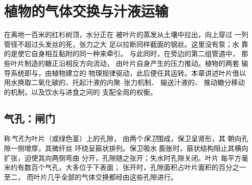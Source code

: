 \chapter{植物的气体交换与汁液运输}\label{ch:b1:plant-transport}

在离地一百米的红杉树顶，水分正在
被叶片的蒸发从土壤中拉出，向上穿过
一列管径不超过头发丝的死，张力之大
足以拉断同样截面的钢丝。这里没有泵；水
靠的是使它自身相互黏附的同一种来牵引。
与此同时，在旁边的第二组管道中，
那些叶片制造的糖正沿相反方向流动，
由叶片自身产生的压力推动。植物的两套
输导系统即与，由植物建立的
物理规律驱动，此后便任其运转。本章讲述叶片借以
用水换取二氧化碳的、托起汁液的内聚–张力机制、
输送汁液的、
推动糖分移动的机制，以及饮水与进食之间的
支配全局的权衡。

\section{气孔：闸门}

\begin{definition}[气孔、保卫细胞]\label{def:b1:plant-transport:stoma}
称\emph{气孔}为叶片（或绿色茎）上的孔隙，
由两个\emph{保卫}围成，保卫呈肾形，其
朝向孔隙一侧增厚，其微纤丝
环绕呈箍状排列。保卫吸水
膨胀时，箍状结构阻止其横向扩张，迫使其向两侧弯曲
分开，孔隙随之张开；失水时孔隙关闭。叶片
每平方毫米约有数百个气孔，大多位于下表面；
张开时，孔隙面积占叶片面积的百分之一至二，
而叶片几乎全部的气体交换都经由这些孔隙进行。
\end{definition}

